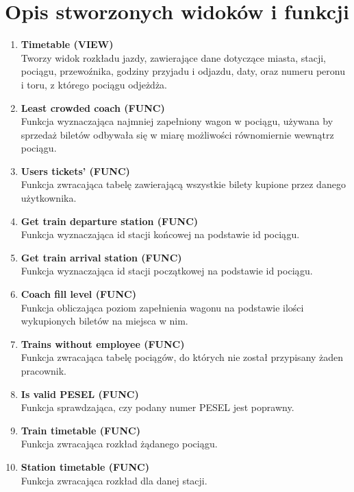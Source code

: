 \section{Opis stworzonych widoków i funkcji}
\begin{enumerate}
    \item \textbf{Timetable (VIEW)}\\
    Tworzy widok rozkładu jazdy, zawierające dane dotyczące miasta, stacji, pociągu, przewoźnika, godziny przyjadu i odjazdu, daty, oraz numeru peronu i toru, z którego pociągu odjeżdża.\\
    
    \item \textbf{Least crowded coach (FUNC)}\\
    Funkcja wyznaczająca najmniej zapełniony wagon w pociągu, używana by sprzedaż biletów odbywała się w miarę możliwości równomiernie wewnątrz pociągu.\\
    
    \item \textbf{Users tickets' (FUNC)}\\
    Funkcja zwracająca tabelę zawierającą wszystkie bilety kupione przez danego użytkownika.\\
    
    \item \textbf{Get train departure station (FUNC)}\\
    Funkcja wyznaczająca id stacji końcowej na podstawie id pociągu.\\
    
    \item \textbf{Get train arrival station (FUNC)}\\
    Funkcja wyznaczająca id stacji początkowej na podstawie id pociągu.\\
    
    \item \textbf{Coach fill level (FUNC)}\\
    Funkcja obliczająca poziom zapełnienia wagonu na podstawie ilości wykupionych biletów na miejsca w nim.\\
    
    \item \textbf{Trains without employee (FUNC)}\\
    Funkcja zwracająca tabelę pociągów, do których nie został przypisany żaden pracownik.\\
    
    \item \textbf{Is valid PESEL (FUNC)}\\
    Funkcja sprawdzająca, czy podany numer PESEL jest poprawny.\\
    
    \item \textbf{Train timetable (FUNC)}\\
    Funkcja zwracająca rozkład żądanego pociągu.\\
    
    \item \textbf{Station timetable (FUNC)}\\
    Funkcja zwracająca rozkład dla danej stacji.
\end{enumerate}


